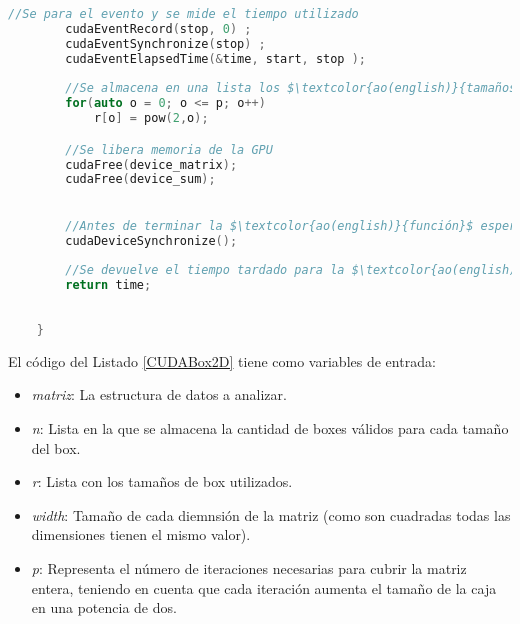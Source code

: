 \begin{lstlisting}[language=C++,caption={Primera versión del Boxcount2D paralelizado con CUDA},label=CUDABox2D,basicstyle=\tiny]
        //Se para el evento y se mide el tiempo utilizado
        cudaEventRecord(stop, 0) ;
        cudaEventSynchronize(stop) ;
        cudaEventElapsedTime(&time, start, stop );
    
        //Se almacena en una lista los $\textcolor{ao(english)}{tamaños}$ de caja que se han utilizado
        for(auto o = 0; o <= p; o++)
            r[o] = pow(2,o); 

        //Se libera memoria de la GPU
        cudaFree(device_matrix);
        cudaFree(device_sum);
    

        //Antes de terminar la $\textcolor{ao(english)}{función}$ esperamos que la memoria haya sido correctamente liberada
        cudaDeviceSynchronize();
    
        //Se devuelve el tiempo tardado para la $\textcolor{ao(english)}{realización}$ del experimento
        return time;
    
    
    }
\end{lstlisting}

El código del Listado \ref{CUDABox2D} tiene como variables de entrada:

\begin{itemize}
    \item \textit{matriz}: La estructura de datos a analizar.
    \item \textit{n}: Lista en la que se almacena la cantidad de boxes válidos para cada tamaño del box.
    \item \textit{r}: Lista con los tamaños de box utilizados.
    \item \textit{width}: Tamaño de cada diemnsión de la matriz (como son cuadradas todas las dimensiones tienen el mismo valor).
    \item \textit{p}: Representa el número de iteraciones necesarias para cubrir la matriz entera, teniendo en cuenta que cada iteración aumenta el tamaño de la caja en una potencia de dos.
\end{itemize}

